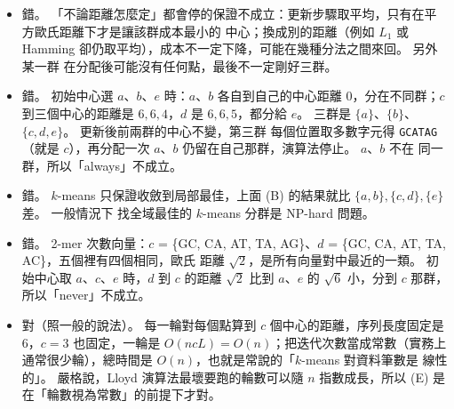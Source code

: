 \begin{pastsoln}
\begin{itemize}
\item[(A)] 錯。 「不論距離怎麼定」都會停的保證不成立：更新步驟取平均，只有在平方歐氏距離下才是讓該群成本最小的
中心；換成別的距離（例如 $L_1$ 或 Hamming 卻仍取平均），成本不一定下降，可能在幾種分法之間來回。 另外某一群
在分配後可能沒有任何點，最後不一定剛好三群。
\item[(B)] 錯。 初始中心選 $a$、$b$、$e$ 時：$a$、$b$ 各自到自己的中心距離 $0$，分在不同群；$c$ 到三個中心的距離是
$6, 6, 4$，$d$ 是 $6, 6, 5$，都分給 $e$。 三群是 $\{a\}$、$\{b\}$、$\{c, d, e\}$。 更新後前兩群的中心不變，第三群
每個位置取多數字元得 \texttt{GCATAG}（就是 $c$），再分配一次 $a$、$b$ 仍留在自己那群，演算法停止。 $a$、$b$ 不在
同一群，所以「always」不成立。
\item[(C)] 錯。 $k$-means 只保證收斂到局部最佳，上面 (B) 的結果就比 $\{a, b\}, \{c, d\}, \{e\}$ 差。 一般情況下
找全域最佳的 $k$-means 分群是 NP-hard 問題。
\item[(D)] 錯。 2-mer 次數向量：$c$ = \{GC, CA, AT, TA, AG\}、$d$ = \{GC, CA, AT, TA, AC\}，五個裡有四個相同，歐氏
距離 $\sqrt{2}$，是所有向量對中最近的一類。 初始中心取 $a$、$c$、$e$ 時，$d$ 到 $c$ 的距離 $\sqrt 2$ 比到 $a$、$e$ 的
$\sqrt 6$ 小，分到 $c$ 那群，所以「never」不成立。
\item[(E)] 對（照一般的說法）。 每一輪對每個點算到 $c$ 個中心的距離，序列長度固定是 $6$，$c = 3$ 也固定，一輪是
$O(n c L) = O(n)$；把迭代次數當成常數（實務上通常很少輪），總時間是 $O(n)$，也就是常說的「$k$-means 對資料筆數是
線性的」。 嚴格說，Lloyd 演算法最壞要跑的輪數可以隨 $n$ 指數成長，所以 (E) 是在「輪數視為常數」的前提下才對。
\end{itemize}
\end{pastsoln}
